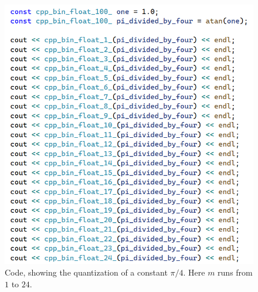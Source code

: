 \documentclass[12pt]{article}
\begin{document}
\pagebreak



\begin{figure} 
\centering
\label{fig7}
  \includegraphics[width = 6 in]{code.png}
  \caption{
Code, showing the quantization of a constant $\pi/4$.
Here $m$ runs from $1$ to $24$.
}
\end{figure}
\end{document}
